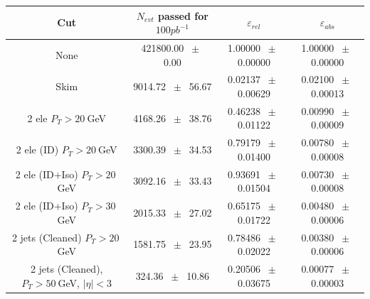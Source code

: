 \begin{table}[htbp] 
\begin{center} 
\begin{tabular}{|c|c|c|c|} 
\hline\hline 
 Cut & $N_{evt}$ passed for $100pb^{-1}$ & $\varepsilon_{rel}$ & $\varepsilon_{abs}$ \\ 
\hline\hline 
None          &           421800.00          $~\pm~$          0.00           &           1.00000          $~\pm~$          0.00000           &           1.00000          $~\pm~$          0.00000          \\          
          Skim          &           9014.72          $~\pm~$          56.67           &           0.02137          $~\pm~$          0.00629           &           0.02100          $~\pm~$          0.00013          \\          
          2 ele $P_T>20~$GeV          &           4168.26          $~\pm~$          38.76           &           0.46238          $~\pm~$          0.01122           &           0.00990          $~\pm~$          0.00009          \\          
          2 ele (ID) $P_T>20~$GeV          &           3300.39          $~\pm~$          34.53           &           0.79179          $~\pm~$          0.01400           &           0.00780          $~\pm~$          0.00008          \\          
          2 ele (ID+Iso) $P_T>20~$GeV          &           3092.16          $~\pm~$          33.43           &           0.93691          $~\pm~$          0.01504           &           0.00730          $~\pm~$          0.00008          \\          
          2 ele (ID+Iso) $P_T>30~$GeV          &           2015.33          $~\pm~$          27.02           &           0.65175          $~\pm~$          0.01722           &           0.00480          $~\pm~$          0.00006          \\          
          2 jets (Cleaned) $P_T>20~$GeV          &           1581.75          $~\pm~$          23.95           &           0.78486          $~\pm~$          0.02022           &           0.00380          $~\pm~$          0.00006          \\          
          2 jets (Cleaned), $P_T>50~$GeV, $ | \eta |<3$          &           324.36          $~\pm~$          10.86           &           0.20506          $~\pm~$          0.03675           &           0.00077          $~\pm~$          0.00003          \\          

\end{tabular}
\end{center}
\end{table}
